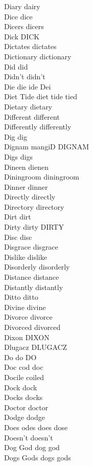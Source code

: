 Diary dairy\\
Dice dice\\
Dicers dicers\\
Dick DICK\\
Dictates dictates\\
Dictionary dictionary\\
Did did\\
Didn't didn't\\
Die die ide Dei\\
Diet Tide diet tide tied\\
Dietary dietary\\
Different different\\
Differently differently\\
Dig dig\\
Dignam mangiD DIGNAM\\
Digs digs\\
Dineen dienen\\
Diningroom diningroom\\
Dinner dinner\\
Directly directly\\
Directory directory\\
Dirt dirt\\
Dirty dirty DIRTY\\
Disc disc\\
Disgrace disgrace\\
Dislike dislike\\
Disorderly disorderly\\
Distance distance\\
Distantly distantly\\
Ditto ditto\\
Divine divine\\
Divorce divorce\\
Divorced divorced\\
Dixon DIXON\\
Dlugacz DLUGACZ\\
Do do DO\\
Doc cod doc\\
Docile coiled\\
Dock dock\\
Docks docks\\
Doctor doctor\\
Dodge dodge\\
Does odes does dose\\
Doesn't doesn't\\
Dog God dog god\\
Dogs Gods dogs gods\\
